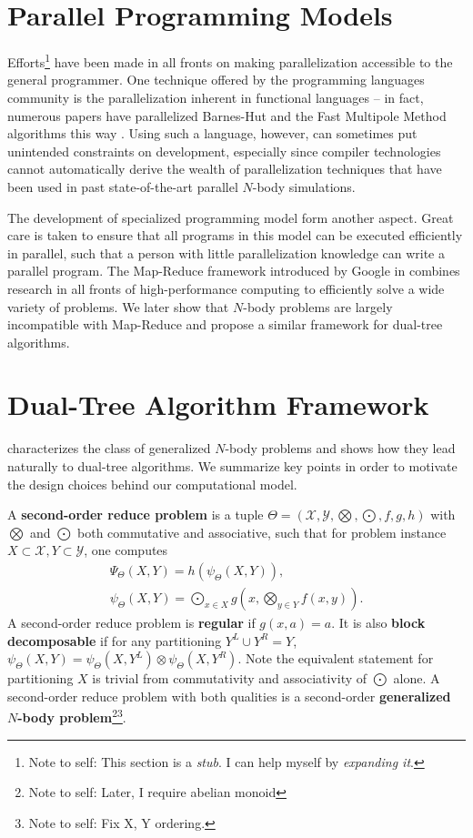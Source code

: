 \documentclass[times, leqno,twocolumn]{article}
\newcommand{\authornote}[1]{\footnote{Note to self: #1}}
\newcommand{\authorsnote}[1]{\authornote{#1}}
\newcommand{\union}{\cup}
\newcommand{\Gnp}{\Psi_{\Theta}}
\newcommand{\gnp}{\psi_{\Theta}}
\newcommand{\defterm}[1]{{\bf #1}}
\newcommand{\kdleft}[1]{#1^{\!L}}
\newcommand{\kdright}[1]{#1^{\!R}}
\begin{document}
\section{Parallel Programming Models}

Efforts\authornote{This section is a {\it stub}. I can help myself by {\it expanding it}.} have been made in all fronts on making parallelization accessible to the general programmer.
One technique offered by the programming languages community is the parallelization inherent in functional languages -- in fact, numerous papers have parallelized Barnes-Hut and the Fast Multipole Method algorithms this way \cite{nesl, parallel_fmm}.
Using such a language, however, can sometimes put unintended constraints on development, especially since compiler technologies cannot automatically derive the wealth of parallelization techniques that have been used in past state-of-the-art parallel $N$-body simulations.

The development of specialized programming model form another aspect.
Great care is taken to ensure that all programs in this model can be executed efficiently in parallel, such that a person with little parallelization knowledge can write a parallel program.
The Map-Reduce framework introduced by Google in \cite{mapreduce} combines research in all fronts of high-performance computing to efficiently solve a wide variety of problems.
We later show that $N$-body problems are largely incompatible with Map-Reduce and propose a similar framework for dual-tree algorithms.

\section{Dual-Tree Algorithm Framework}

\cite{ryan_nips} characterizes the class of generalized $N$-body problems and shows how they lead naturally to dual-tree algorithms.
We summarize key points in order to motivate the design choices behind our computational model.

A \defterm{second-order reduce problem} is a tuple $\Theta = (\mathcal{X}, \mathcal{Y}, \bigotimes, \bigodot, f, g, h)$ with $\bigotimes$ and $\bigodot$ both commutative and associative, such that for problem instance $X \subset {\mathcal{X}}, Y \subset {\mathcal{Y}}$, one computes
\[\begin{array}{l}
  \displaystyle \Gnp(X, Y) = h(\gnp(X, Y)),
  \\
  \displaystyle \gnp(X, Y) = \bigodot_{x \in X} g\!\left(x, \bigotimes_{y \in Y} f(x, y) \right).
\end{array}\]
\noindent A second-order reduce problem is \defterm{regular} if $g(x, a) = a$.
It is also \defterm{block decomposable} if for any partitioning $\kdleft{Y} \union \kdright{Y} = Y$, $\gnp(X,Y) = \gnp(X,\kdleft{Y}) \otimes \gnp(X,\kdright{Y})$.
Note the equivalent statement for partitioning $X$ is trivial from commutativity and associativity of $\bigodot$ alone.
A second-order reduce problem with both qualities is a second-order \defterm{generalized $N$-body problem}\authorsnote{Later, I require abelian monoid}\authorsnote{Fix X, Y ordering.}.
\end{document}
